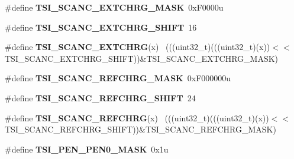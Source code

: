 \begin{DoxyCompactItemize}
\item 
\hypertarget{group___t_s_i___register___masks_gab5798996c8488e915c2db48de5f5d0bb}{}\#define {\bfseries T\+S\+I\+\_\+\+S\+C\+A\+N\+C\+\_\+\+E\+X\+T\+C\+H\+R\+G\+\_\+\+M\+A\+S\+K}~0x\+F0000u\label{group___t_s_i___register___masks_gab5798996c8488e915c2db48de5f5d0bb}

\item 
\hypertarget{group___t_s_i___register___masks_ga5381f1f7b0d3256890453050ef35486d}{}\#define {\bfseries T\+S\+I\+\_\+\+S\+C\+A\+N\+C\+\_\+\+E\+X\+T\+C\+H\+R\+G\+\_\+\+S\+H\+I\+F\+T}~16\label{group___t_s_i___register___masks_ga5381f1f7b0d3256890453050ef35486d}

\item 
\hypertarget{group___t_s_i___register___masks_ga95fe823ddb5a6450bff2885fba98d5b3}{}\#define {\bfseries T\+S\+I\+\_\+\+S\+C\+A\+N\+C\+\_\+\+E\+X\+T\+C\+H\+R\+G}(x)                                      ~(((uint32\+\_\+t)(((uint32\+\_\+t)(x))$<$$<$T\+S\+I\+\_\+\+S\+C\+A\+N\+C\+\_\+\+E\+X\+T\+C\+H\+R\+G\+\_\+\+S\+H\+I\+F\+T))\&T\+S\+I\+\_\+\+S\+C\+A\+N\+C\+\_\+\+E\+X\+T\+C\+H\+R\+G\+\_\+\+M\+A\+S\+K)\label{group___t_s_i___register___masks_ga95fe823ddb5a6450bff2885fba98d5b3}

\item 
\hypertarget{group___t_s_i___register___masks_ga080be6d8826668cf4d63346b449931ed}{}\#define {\bfseries T\+S\+I\+\_\+\+S\+C\+A\+N\+C\+\_\+\+R\+E\+F\+C\+H\+R\+G\+\_\+\+M\+A\+S\+K}~0x\+F000000u\label{group___t_s_i___register___masks_ga080be6d8826668cf4d63346b449931ed}

\item 
\hypertarget{group___t_s_i___register___masks_ga636c8873ea4eb5255f0f76fef1a8a5ba}{}\#define {\bfseries T\+S\+I\+\_\+\+S\+C\+A\+N\+C\+\_\+\+R\+E\+F\+C\+H\+R\+G\+\_\+\+S\+H\+I\+F\+T}~24\label{group___t_s_i___register___masks_ga636c8873ea4eb5255f0f76fef1a8a5ba}

\item 
\hypertarget{group___t_s_i___register___masks_ga1e5d38ac15864f154123a96f9f4b5720}{}\#define {\bfseries T\+S\+I\+\_\+\+S\+C\+A\+N\+C\+\_\+\+R\+E\+F\+C\+H\+R\+G}(x)                                      ~(((uint32\+\_\+t)(((uint32\+\_\+t)(x))$<$$<$T\+S\+I\+\_\+\+S\+C\+A\+N\+C\+\_\+\+R\+E\+F\+C\+H\+R\+G\+\_\+\+S\+H\+I\+F\+T))\&T\+S\+I\+\_\+\+S\+C\+A\+N\+C\+\_\+\+R\+E\+F\+C\+H\+R\+G\+\_\+\+M\+A\+S\+K)\label{group___t_s_i___register___masks_ga1e5d38ac15864f154123a96f9f4b5720}

\item 
\hypertarget{group___t_s_i___register___masks_ga2fe95bf659075368ab23b5876de8d79d}{}\#define {\bfseries T\+S\+I\+\_\+\+P\+E\+N\+\_\+\+P\+E\+N0\+\_\+\+M\+A\+S\+K}~0x1u\label{group___t_s_i___register___masks_ga2fe95bf659075368ab23b5876de8d79d}


\end{DoxyCompactItemize}
